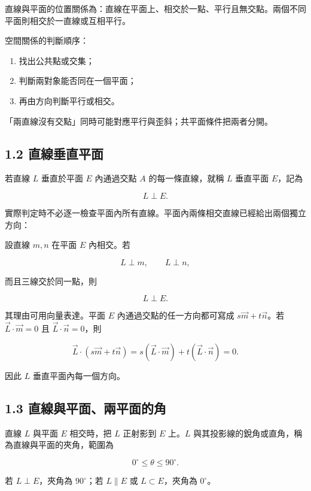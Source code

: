 \documentclass[11pt,a4paper]{article}
\providecommand{\tightlist}{%
  \setlength{\itemsep}{0pt}\setlength{\parskip}{0pt}}
\begin{document}
直線與平面的位置關係為：直線在平面上、相交於一點、平行且無交點。兩個不同平面則相交於一直線或互相平行。

空間關係的判斷順序：

\begin{enumerate}
\def\labelenumi{\arabic{enumi}.}
\tightlist
\item
  找出公共點或交集；
\item
  判斷兩對象能否同在一個平面；
\item
  再由方向判斷平行或相交。
\end{enumerate}

「兩直線沒有交點」同時可能對應平行與歪斜；共平面條件把兩者分開。

\subsection{1.2 直線垂直平面}\label{ux76f4ux7ddaux5782ux76f4ux5e73ux9762}

若直線 \(L\) 垂直於平面 \(E\) 內通過交點 \(A\) 的每一條直線，就稱 \(L\) 垂直平面 \(E\)，記為

\[
L\perp E.
\]

實際判定時不必逐一檢查平面內所有直線。平面內兩條相交直線已經給出兩個獨立方向：

設直線 \(m,n\) 在平面 \(E\) 內相交。若

\[
L\perp m,\qquad L\perp n,
\]

而且三線交於同一點，則

\[
\boxed{L\perp E}.
\]

其理由可用向量表達。平面 \(E\) 內通過交點的任一方向都可寫成 \(s\vec m+t\vec n\)。若 \(\vec L\cdot\vec m=0\) 且 \(\vec L\cdot\vec n=0\)，則

\[
\vec L\cdot(s\vec m+t\vec n)
=s(\vec L\cdot\vec m)+t(\vec L\cdot\vec n)=0.
\]

因此 \(L\) 垂直平面內每一個方向。

\subsection{1.3 直線與平面、兩平面的角}\label{ux76f4ux7ddaux8207ux5e73ux9762ux5169ux5e73ux9762ux7684ux89d2}

直線 \(L\) 與平面 \(E\) 相交時，把 \(L\) 正射影到 \(E\) 上。\(L\) 與其投影線的銳角或直角，稱為直線與平面的夾角，範圍為

\[
0^\circ\le\theta\le90^\circ.
\]

若 \(L\perp E\)，夾角為 \(90^\circ\)；若 \(L\parallel E\) 或 \(L\subset E\)，夾角為 \(0^\circ\)。
\end{document}

